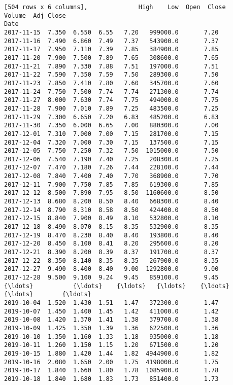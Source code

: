 \documentclass[11pt]{article}
\begin{document}
\begin{Verbatim}[commandchars=\\\{\}]
[504 rows x 6 columns],              High    Low  Open  Close     Volume  Adj Close
Date                                                       
2017-11-15  7.350  6.550  6.55   7.20   999000.0       7.20
2017-11-16  7.490  6.860  7.49   7.37   543900.0       7.37
2017-11-17  7.950  7.110  7.39   7.85   384900.0       7.85
2017-11-20  7.900  7.500  7.89   7.65   308600.0       7.65
2017-11-21  7.890  7.330  7.88   7.51   197000.0       7.51
2017-11-22  7.590  7.350  7.59   7.50   289300.0       7.50
2017-11-23  7.850  7.410  7.80   7.60   345700.0       7.60
2017-11-24  7.750  7.500  7.74   7.74   271300.0       7.74
2017-11-27  8.000  7.630  7.74   7.75   494000.0       7.75
2017-11-28  7.900  7.010  7.89   7.25   483500.0       7.25
2017-11-29  7.300  6.650  7.20   6.83   485200.0       6.83
2017-11-30  7.350  6.000  6.65   7.00   880300.0       7.00
2017-12-01  7.310  7.000  7.00   7.15   281700.0       7.15
2017-12-04  7.320  7.000  7.30   7.15   137500.0       7.15
2017-12-05  7.750  7.250  7.32   7.50  1015000.0       7.50
2017-12-06  7.540  7.190  7.40   7.25   208300.0       7.25
2017-12-07  7.470  7.180  7.26   7.44   228100.0       7.44
2017-12-08  7.840  7.400  7.40   7.70   368900.0       7.70
2017-12-11  7.900  7.750  7.85   7.85   619300.0       7.85
2017-12-12  8.500  7.890  7.95   8.50  1160600.0       8.50
2017-12-13  8.680  8.200  8.50   8.40   668300.0       8.40
2017-12-14  8.790  8.310  8.58   8.50   424400.0       8.50
2017-12-15  8.840  7.900  8.49   8.10   532800.0       8.10
2017-12-18  8.490  8.070  8.15   8.35   532900.0       8.35
2017-12-19  8.470  8.230  8.40   8.40   193800.0       8.40
2017-12-20  8.450  8.100  8.41   8.20   295600.0       8.20
2017-12-21  8.390  8.200  8.39   8.37   191700.0       8.37
2017-12-22  8.350  8.140  8.35   8.35   267900.0       8.35
2017-12-27  9.490  8.400  8.40   9.00  1292800.0       9.00
2017-12-28  9.500  9.100  9.24   9.45   859100.0       9.45
{\ldots}           {\ldots}    {\ldots}   {\ldots}    {\ldots}        {\ldots}        {\ldots}
2019-10-04  1.520  1.430  1.51   1.47   372300.0       1.47
2019-10-07  1.450  1.400  1.45   1.42   411000.0       1.42
2019-10-08  1.420  1.370  1.41   1.38   379700.0       1.38
2019-10-09  1.425  1.350  1.39   1.36   622500.0       1.36
2019-10-10  1.350  1.160  1.33   1.18   935000.0       1.18
2019-10-11  1.260  1.150  1.15   1.20   671500.0       1.20
2019-10-15  1.880  1.420  1.44   1.82  4944900.0       1.82
2019-10-16  2.080  1.650  2.00   1.75  4198000.0       1.75
2019-10-17  1.840  1.660  1.80   1.78  1085900.0       1.78
2019-10-18  1.840  1.680  1.83   1.73   851400.0       1.73

\end{Verbatim}
\end{document}
